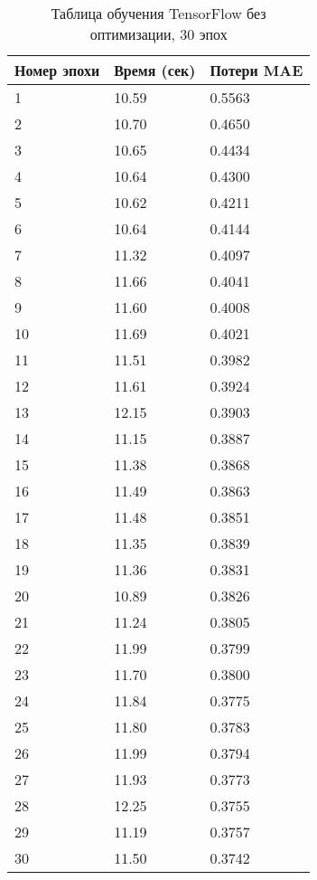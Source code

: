 \documentclass[a4paper,12pt,titlepage,final]{article}
\begin{document}
\begin{table}[H]
\centering
\begin{tabular}{|p{6.4cm}|p{3.2cm}|p{3.2cm}|}
\hline
Номер эпохи & Время (сек) & Потери MAE \\
\hline
1 & 10.59 & 0.5563 \\ [1.5ex]
\hline
2 & 10.70 & 0.4650 \\ [1.5ex]
\hline
3 & 10.65 & 0.4434 \\ [1.5ex]
\hline
4 & 10.64 & 0.4300 \\ [1.5ex]
\hline
5 & 10.62 & 0.4211 \\ [1.5ex]
\hline
6 & 10.64 & 0.4144 \\ [1.5ex]
\hline
7 & 11.32 & 0.4097 \\ [1.5ex]
\hline
8 & 11.66 & 0.4041 \\ [1.5ex]
\hline
9 & 11.60 & 0.4008 \\ [1.5ex]
\hline
10 & 11.69 & 0.4021 \\ [1.5ex]
\hline
11 & 11.51 & 0.3982 \\ [1.5ex]
\hline
12 & 11.61 & 0.3924 \\ [1.5ex]
\hline
13 & 12.15 & 0.3903 \\ [1.5ex]
\hline
14 & 11.15 & 0.3887 \\ [1.5ex]
\hline
15 & 11.38 & 0.3868 \\ [1.5ex]
\hline
16 & 11.49 & 0.3863 \\ [1.5ex]
\hline
17 & 11.48 & 0.3851 \\ [1.5ex]
\hline
18 & 11.35 & 0.3839 \\ [1.5ex]
\hline
19 & 11.36 & 0.3831 \\ [1.5ex]
\hline
20 & 10.89 & 0.3826 \\ [1.5ex]
\hline
21 & 11.24 & 0.3805 \\ [1.5ex]
\hline
22 & 11.99 & 0.3799 \\ [1.5ex]
\hline
23 & 11.70 & 0.3800 \\ [1.5ex]
\hline
24 & 11.84 & 0.3775 \\ [1.5ex]
\hline
25 & 11.80 & 0.3783 \\ [1.5ex]
\hline
26 & 11.99 & 0.3794 \\ [1.5ex]
\hline
27 & 11.93 & 0.3773 \\ [1.5ex]
\hline
28 & 12.25 & 0.3755 \\ [1.5ex]
\hline
29 & 11.19 & 0.3757 \\ [1.5ex]
\hline
30 & 11.50 & 0.3742 \\ [1.5ex]
\hline
\end{tabular}
\caption{Таблица обучения TensorFlow без оптимизации, 30 эпох}
\label{gputable3}
\end{table}
\end{document}
